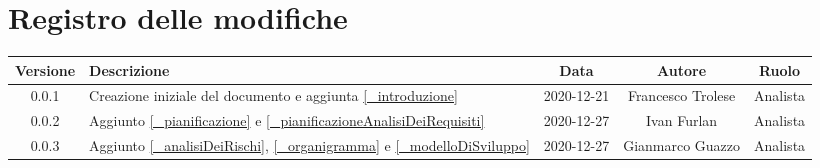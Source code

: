 \section*{Registro delle modifiche}

\begin{center}
	\begin{longtable}{|c|p{5cm}|c|c|c|}
		\hline
		\rowcolor{lighter-grayer}
		\textbf{Versione} & \textbf{Descrizione} & \textbf{Data} & \textbf{Autore} & \textbf{Ruolo} \\
		\hline
		\endfirsthead


		\hline
		0.0.1 & Creazione iniziale del documento e aggiunta \ref{_introduzione} & 2020-12-21 & Francesco Trolese & Analista\\
		\hline
		0.0.2 & Aggiunto \ref{_pianificazione} e \ref{_pianificazioneAnalisiDeiRequisiti} & 2020-12-27 & Ivan Furlan & Analista\\
		\hline
		0.0.3 & Aggiunto \ref{_analisiDeiRischi}, \ref{_organigramma} e \ref{_modelloDiSviluppo} & 2020-12-27 & Gianmarco Guazzo & Analista\\
		\hline
	\end{longtable}
\end{center}